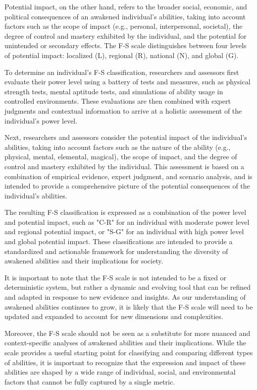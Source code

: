 \documentclass[12pt]{article}
\begin{document}
Potential impact, on the other hand, refers to the broader social, economic, and political consequences of an awakened individual's abilities, taking into account factors such as the scope of impact (e.g., personal, interpersonal, societal), the degree of control and mastery exhibited by the individual, and the potential for unintended or secondary effects. The F-S scale distinguishes between four levels of potential impact: localized (L), regional (R), national (N), and global (G).

To determine an individual's F-S classification, researchers and assessors first evaluate their power level using a battery of tests and measures, such as physical strength tests, mental aptitude tests, and simulations of ability usage in controlled environments. These evaluations are then combined with expert judgments and contextual information to arrive at a holistic assessment of the individual's power level.

Next, researchers and assessors consider the potential impact of the individual's abilities, taking into account factors such as the nature of the ability (e.g., physical, mental, elemental, magical), the scope of impact, and the degree of control and mastery exhibited by the individual. This assessment is based on a combination of empirical evidence, expert judgment, and scenario analysis, and is intended to provide a comprehensive picture of the potential consequences of the individual's abilities.

The resulting F-S classification is expressed as a combination of the power level and potential impact, such as "C-R" for an individual with moderate power level and regional potential impact, or "S-G" for an individual with high power level and global potential impact. These classifications are intended to provide a standardized and actionable framework for understanding the diversity of awakened abilities and their implications for society.

It is important to note that the F-S scale is not intended to be a fixed or deterministic system, but rather a dynamic and evolving tool that can be refined and adapted in response to new evidence and insights. As our understanding of awakened abilities continues to grow, it is likely that the F-S scale will need to be updated and expanded to account for new dimensions and complexities.

Moreover, the F-S scale should not be seen as a substitute for more nuanced and context-specific analyses of awakened abilities and their implications. While the scale provides a useful starting point for classifying and comparing different types of abilities, it is important to recognize that the expression and impact of these abilities are shaped by a wide range of individual, social, and environmental factors that cannot be fully captured by a single metric.
\end{document}
